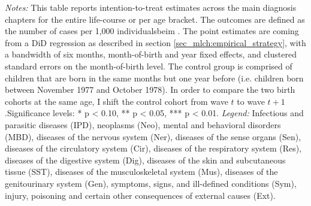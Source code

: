 \begin{table}[H]
\begin{threeparttable}
{\begin{tabular}{l*{5}{c}}
				\bottomrule 
		\end{tabular}}
	\end{threeparttable} 
	\begin{minipage}{0.95\linewidth}
		\scriptsize \emph{Notes:} This table reports intention-to-treat estimates across the main diagnosis chapters for the entire life-course or per age bracket. The outcomes are defined as the number of cases per 1,000 individualsbeim . The point estimates are coming from a DiD regression as described in section \ref{sec_mlch:empirical_strategy}, with a bandwidth of six months, month-of-birth and year fixed effects, and clustered standard errors on the month-of-birth level. The control group is comprised of children that are born in the same months but one year before (i.e. children born between November 1977 and October 1978). In order to compare the two birth cohorts at the same age, I shift the control cohort from wave $t$ to wave $t+1$.\newline Significance levels: * p < 0.10, ** p < 0.05, *** p < 0.01.\newline
		\emph{Legend:} Infectious and parasitic diseases (IPD), neoplasms (Neo), mental and behavioral disorders (MBD), diseases of the nervous system (Ner), diseases of the sense organs (Sen), diseases of the circulatory system (Cir), diseases of the respiratory system (Res), diseases of the digestive system (Dig), diseases of the skin and subcutaneous tissue (SST), diseases of the musculoskeletal system (Mus), diseases of the genitourinary system (Gen), symptoms, signs, and ill-defined conditions (Sym), injury, poisoning and certain other consequences of external causes (Ext).\newline %
	\end{minipage}
\end{table} 
\vspace*{\fill}\clearpage 
\restoregeometry





% 
% 


